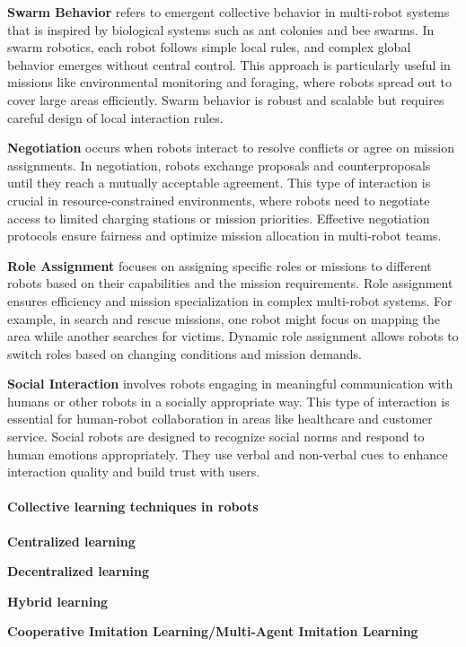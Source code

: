 \documentclass{book}
\begin{document}
\textbf{Swarm Behavior} refers to emergent collective behavior in multi-robot systems that is inspired by biological systems such as ant colonies and bee swarms. In swarm robotics, each robot follows simple local rules, and complex global behavior emerges without central control. This approach is particularly useful in missions like environmental monitoring and foraging, where robots spread out to cover large areas efficiently. Swarm behavior is robust and scalable but requires careful design of local interaction rules.

\textbf{Negotiation} occurs when robots interact to resolve conflicts or agree on mission assignments. In negotiation, robots exchange proposals and counterproposals until they reach a mutually acceptable agreement. This type of interaction is crucial in resource-constrained environments, where robots need to negotiate access to limited charging stations or mission priorities. Effective negotiation protocols ensure fairness and optimize mission allocation in multi-robot teams.

\textbf{Role Assignment} focuses on assigning specific roles or missions to different robots based on their capabilities and the mission requirements. Role assignment ensures efficiency and mission specialization in complex multi-robot systems. For example, in search and rescue missions, one robot might focus on mapping the area while another searches for victims. Dynamic role assignment allows robots to switch roles based on changing conditions and mission demands.

\textbf{Social Interaction} involves robots engaging in meaningful communication with humans or other robots in a socially appropriate way. This type of interaction is essential for human-robot collaboration in areas like healthcare and customer service. Social robots are designed to recognize social norms and respond to human emotions appropriately. They use verbal and non-verbal cues to enhance interaction quality and build trust with users. 


\paragraph{Collective learning techniques in robots}
\textbf{Centralized learning}

\textbf{Decentralized learning}

\textbf{Hybrid learning}

\textbf{Cooperative Imitation Learning/Multi-Agent Imitation Learning}
\end{document}
